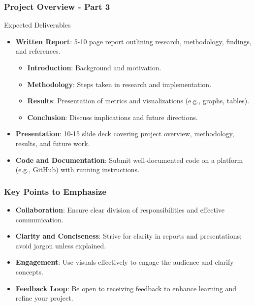 \documentclass{beamer}
\begin{document}
\begin{frame}[fragile]
    \frametitle{Project Overview - Part 3}
    \begin{block}{Expected Deliverables}
        \begin{itemize}
            \item \textbf{Written Report}: 5-10 page report outlining research, methodology, findings, and references.
            \begin{itemize}
                \item \textbf{Introduction}: Background and motivation.
                \item \textbf{Methodology}: Steps taken in research and implementation.
                \item \textbf{Results}: Presentation of metrics and visualizations (e.g., graphs, tables).
                \item \textbf{Conclusion}: Discuss implications and future directions.
            \end{itemize}
            \item \textbf{Presentation}: 10-15 slide deck covering project overview, methodology, results, and future work.
            \item \textbf{Code and Documentation}: Submit well-documented code on a platform (e.g., GitHub) with running instructions.
        \end{itemize}
    \end{block}
\end{frame}

\begin{frame}[fragile]
    \frametitle{Key Points to Emphasize}
    \begin{itemize}
        \item \textbf{Collaboration}: Ensure clear division of responsibilities and effective communication.
        \item \textbf{Clarity and Conciseness}: Strive for clarity in reports and presentations; avoid jargon unless explained.
        \item \textbf{Engagement}: Use visuals effectively to engage the audience and clarify concepts.
        \item \textbf{Feedback Loop}: Be open to receiving feedback to enhance learning and refine your project.
    \end{itemize}
\end{frame}
\end{document}
